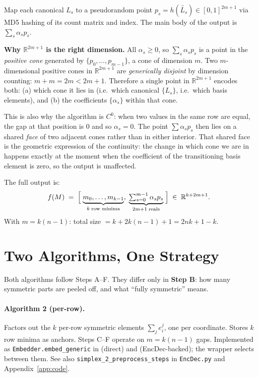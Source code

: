 \documentclass[11pt,a4paper]{article}
\newcommand{\encdecpy}{\texttt{EncDec.py}}
\newcommand{\eji}[2]{e^{#1}_{#2}}       %
\newcommand{\hash}[1]{h(#1)}            %
\newcommand{\canon}[1]{\widetilde{#1}}  %
\newcommand{\R}{\mathbb{R}}
\begin{document}
Map each canonical $L_s$ to a pseudorandom point $p_s = \hash{\canon{L_s}}
\in [0,1]^{2m+1}$ via MD5 hashing of its count matrix and index.  The main
body of the output is $\sum_s \alpha_s p_s$.

\begin{tcolorbox}[keybox]
\textbf{Why $\R^{2m+1}$ is the right dimension.}
All $\alpha_s \ge 0$, so $\sum_s \alpha_s p_s$ is a point in the
\emph{positive cone} generated by $\{p_0,\ldots,p_{m-1}\}$, a cone of
dimension $m$.  Two $m$-dimensional positive cones in $\R^{2m+1}$ are
\emph{generically disjoint} by dimension counting: $m + m = 2m < 2m+1$.
Therefore a single point in $\R^{2m+1}$ encodes both:
(a) which cone it lies in (i.e.\ which canonical $\{L_s\}$, i.e.\ which basis
elements), and (b) the coefficients $\{\alpha_s\}$ within that cone.

This is also why the algorithm is $C^0$: when two values in the same row are
equal, the gap at that position is $0$ and so $\alpha_s = 0$.  The point
$\sum \alpha_s p_s$ then lies on a shared \emph{face} of two adjacent cones
rather than in either interior.  That shared face is the geometric expression
of the continuity: the change in which cone we are in happens exactly at the
moment when the coefficient of the transitioning basis element is zero, so the
output is unaffected.
\end{tcolorbox}

\noindent
The full output is:
\[
  f(M) \;=\; \Bigl[\;\underbrace{m_0,\ldots,m_{k-1}}_{k\;\text{row minima}},\;
                     \underbrace{\textstyle\sum_{s=0}^{m-1}\alpha_s p_s}_{2m+1\;\text{reals}}
             \;\Bigr]
  \;\in\; \R^{k + 2m + 1}.
\]
With $m = k(n-1)$: total size $= k + 2k(n-1) + 1 = 2nk+1-k$.

\section{Two Algorithms, One Strategy}
\label{sec:two-algs}

Both algorithms follow Steps A--F.  They differ only in \textbf{Step B}: how
many symmetric parts are peeled off, and what ``fully symmetric'' means.

\paragraph{Algorithm 2 (per-row).}
Factors out the $k$ per-row symmetric elements $\sum_j \eji{j}{i}$, one per
coordinate.  Stores $k$ row minima as anchors.  Steps C--F operate on
$m = k(n-1)$ gaps.
Implemented as \texttt{Embedder.embed\_generic} in \algtwoapy{} (direct) and
\algtwobpy{} (EncDec-backed); the \algtwopy{} wrapper selects between them.
See also \texttt{simplex\_2\_preprocess\_steps} in \encdecpy{} and
Appendix~\ref{app:code}.
\end{document}

